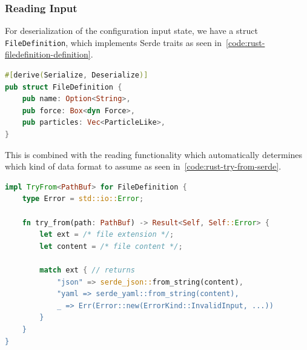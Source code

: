 \documentclass[11pt,
               a4paper,
               bibtotoc,
               idxtotoc,
               headsepline,
               footsepline,
               footexclude,
               BCOR12mm,
               DIV13,
               openany,   %
               ]
               {scrbook}
\begin{document}

\subsubsection{Reading Input}

For deserialization of the configuration input state, we have a struct \texttt{FileDefinition}, which implements Serde traits as seen in~\autoref{code:rust-filedefinition-definition}.

\vspace{0.5em}
\begin{lstlisting}[style=eclipse-rust, language=Rust, basicstyle=\ttfamily\small, caption={An example of how the \texttt{FileDefinition} struct is implemented. (Note: Some struct fields have been removed for simplicity.)}, label=code:rust-filedefinition-definition]
#[derive(Serialize, Deserialize)]
pub struct FileDefinition {
    pub name: Option<String>,
    pub force: Box<dyn Force>,
    pub particles: Vec<ParticleLike>,
}
\end{lstlisting}

This is combined with the reading functionality which automatically determines which kind of data format to assume as seen in~\autoref{code:rust-try-from-serde}.

\vspace{0.5em}
\begin{lstlisting}[style=eclipse-rust, language=Rust, basicstyle=\ttfamily\small, caption={An example of how the \texttt{FileDefinition} deserialization is implemented. (Note: This example is highly simplified to the point where this will not compile: The types do not match. The \texttt{match} block returns a \texttt{FileDefinition} value.)}, label=code:rust-try-from-serde]
impl TryFrom<PathBuf> for FileDefinition {
    type Error = std::io::Error;

    fn try_from(path: PathBuf) -> Result<Self, Self::Error> {
        let ext = /* file extension */;
        let content = /* file content */;

        match ext { // returns
            "json" => serde_json::from_string(content),
            "yaml => serde_yaml::from_string(content),
            _ => Err(Error::new(ErrorKind::InvalidInput, ...))
        }
    }
}
\end{lstlisting}
\end{document}
